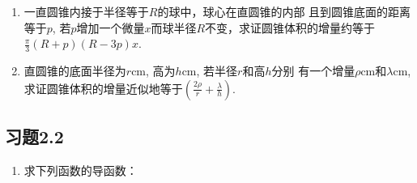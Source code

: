 \begin{ex}
\begin{enumerate}
\item 一直圆锥内接于半径等于$R$的球中，球心在直圆锥的内部
且到圆锥底面的距离等于$p$, 若$p$增加一个微量$x$而球半径$R$不变，求证圆锥体积的增量约等于$\frac{\pi}{3}(R+p)(R-3p) x$.
\item 直圆锥的底面半径为$r$cm, 高为$h$cm, 若半径$r$和高$h$分别
有一个增量$\rho$cm和$\lambda$cm, 求证圆锥体积的增量近似地等于$\left(\frac{2\rho}{r}+\frac{\lambda}{h}\right)$.
\end{enumerate}
\end{ex}



\subsection*{习题2.2}
\begin{enumerate}
    \item 求下列函数的导函数：
\begin{enumerate}


\end{enumerate}
\end{enumerate}

